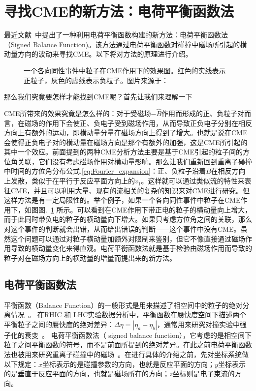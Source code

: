 \bigskip

\section{寻找CME的新方法：电荷平衡函数法}

最近文献~\cite{Tang2019}中提出了一种利用电荷平衡函数构建的新方法：电荷平衡函数法（Signed Balance Function)。该方法通过电荷平衡函数对碰撞中磁场所引起的横动量方向的波动来寻找CME。以下将对方法的原理进行介绍。

\begin{figure}[htbp]
\centering
{}
\caption{一个各向同性事件中粒子在CME作用下的效果图。红色的实线表示正粒子，灰色的虚线表示负粒子。图片来源于：~\citep{Tang2019}}
\label{fig:Aihong_KatongChargeSeparation}
\end{figure}

那么我们究竟要怎样才能找到CME呢？首先让我们来理解一下

CME所带来的效果究竟是怎么样的：对于受磁场$-\hat{B}$作用而形成的正、负粒子对而言，在磁场的作用下会使正、负电子受到磁场作用，从而导致正负电子分别在相反方向上有额外的运动，即横动量分量在磁场方向上得到了增大。也就是说在CME会使得正负电子对的横动量在磁场方向是那个有额外的加强，这是CME所引起的其中一个效应。前面提到的两种CME分析方法主要是基于CME引起的粒子间的方位角关联，它们没有考虑磁场作用对横动量影响。那么让我们重新回到重离子碰撞中时间的方位角分布公式.\ref {eq:Fourier_expansion}：正、负粒子沿着$B$在相反方向上发散，类似于在平行于反应平面方向上的$v_1$。这样就可以通过类似流的特性来表征CME，并且可以利用大量、现有的流相关的复杂的知识来对CME进行研究。但这样方法是有一定局限性的。举个例子，如果一个各向同性事件中粒子在CME作用下，如图图.~\ref{fig:Aihong_KatongChargeSeparation} 所示。可以看到在CME作用下带正电的粒子的横动量向上增大，而于此同时带负电的粒子的横动量向下增大。如果只考虑方位角之间的关联，那么对这个事件的判断就会出错，从而给出错误的判断——这个事件中没有CME。虽然这个问题可以通过对粒子横动量加额外对限制来鉴别，但它不像直接通过磁场作用导致的横动量变化来得直观。电荷平衡函数法就是基于检验由磁场作用而导致的粒子对在磁场方向上的横动量的增量而提出来的新方法。


\subsection{电荷平衡函数法}

平衡函数（Balance Function）的一般形式是用来描述了相空间中的粒子的绝对分离情况~\cite{Bass:2000az,Adams:2003kg}。
在RHIC 和 LHC实验数据分析中，平衡函数在赝快度空间下描述两个平衡粒子之间的赝快度的绝对差异：$\Delta \eta = |\eta_a - \eta_b|$，通常用来研究对撞实验中强子化的衰变~\cite{bf1,bf2,bf3,bf4,bf5}。
电荷平衡函数法（ signed balance function），它考虑的是相空间下粒子之间平衡函数的符号，而不是前面所提到的绝对差异。在此之前电荷平衡函数法也被用来研究重离子碰撞中的磁场~\cite{Ye:2018jwq}。在进行具体的介绍之前，先对坐标系统做以下规定：$x$坐标表示的是碰撞参数的方向，也就是反应平面的方向；$y$坐标表示的是垂直于反应平面的方向，也就是磁场所在的方向；$z$坐标则是电子束流的方向。

